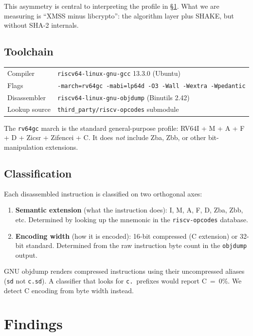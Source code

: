 \documentclass[11pt,a4paper]{article}
\begin{document}
This asymmetry is central to interpreting the profile in
\S\ref{sec:findings}.  What we are measuring is ``XMSS minus libcrypto'':
the algorithm layer plus SHAKE, but without SHA-2 internals.

\subsection{Toolchain}

\begin{tabular}{@{}lp{9cm}@{}}
  Compiler   & \texttt{riscv64-linux-gnu-gcc} 13.3.0 (Ubuntu) \\
  Flags      & \texttt{-march=rv64gc -mabi=lp64d -O3 -Wall -Wextra -Wpedantic} \\
  Disassembler & \texttt{riscv64-linux-gnu-objdump} (Binutils 2.42) \\
  Lookup source & \texttt{third\_party/riscv-opcodes} submodule \\
\end{tabular}

The \texttt{rv64gc} march is the standard general-purpose profile:
RV64I + M + A + F + D + Zicsr + Zifencei + C.  It does \emph{not}
include Zba, Zbb, or other bit-manipulation extensions.

\subsection{Classification}

Each disassembled instruction is classified on two orthogonal axes:

\begin{enumerate}[nosep]
  \item \textbf{Semantic extension} (what the instruction does): I, M,
    A, F, D, Zba, Zbb, etc.  Determined by looking up the mnemonic in
    the \texttt{riscv-opcodes} database.
  \item \textbf{Encoding width} (how it is encoded): 16-bit compressed
    (C extension) or 32-bit standard.  Determined from the raw
    instruction byte count in the \texttt{objdump} output.
\end{enumerate}

GNU objdump renders compressed instructions using their uncompressed
aliases (\texttt{sd} not \texttt{c.sd}).  A classifier that looks for
\texttt{c.}~prefixes would report C~=~0\%.  We detect C encoding from
byte width instead.

\section{Findings}
\label{sec:findings}
\end{document}
